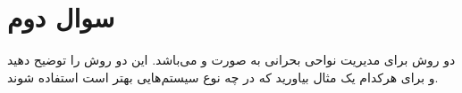 \section{سوال دوم}

دو روش برای مدیریت نواحی بحرانی به صورت  و  می‌باشد. این دو روش را توضیح دهید و برای هرکدام یک مثال بیاورید که در چه نوع سیستم‌هایی بهتر است استفاده شوند.




\begin{qsolve}
	
\end{qsolve}